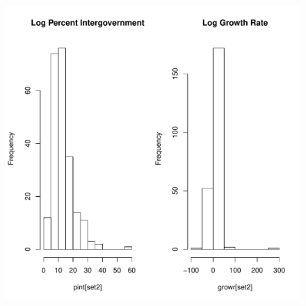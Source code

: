 \documentclass{article}\usepackage[]{graphicx}\usepackage[]{color}
\makeatletter
\def\maxwidth{ %
  \ifdim\Gin@nat@width>\linewidth
    \linewidth
  \else
    \Gin@nat@width
  \fi
}
\newenvironment{knitrout}{}{} %
\makeatother
\begin{document}
\begin{figure}
\begin{center}
\begin{knitrout}
\includegraphics[width=\maxwidth,height=0.3\textheight]{figure/Not_Transformed_Predictors-3} 

\end{knitrout}
  \end{center}
\end{figure}
%
\end{document}
